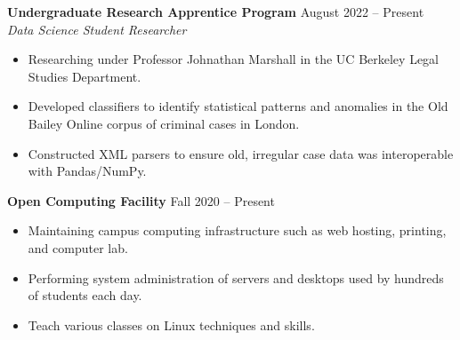 \documentclass{article}
\begin{document}
\begin{adjustwidth}{1em}{1em}


    \textbf{Undergraduate Research Apprentice Program} \hfill August 2022 -- Present
    \\ \textit{Data Science Student Researcher}
    \begin{itemize}
        \item Researching under Professor Johnathan Marshall in the UC Berkeley Legal Studies Department.
        \item Developed classifiers to identify statistical patterns and anomalies in the Old Bailey Online corpus of criminal cases in London.
        \item Constructed XML parsers to ensure old, irregular case data was interoperable with Pandas/NumPy.
    \end{itemize}

    \vspace{1mm}


    \textbf{Open Computing Facility} \hfill Fall 2020 -- Present
    \begin{itemize}
        \item Maintaining campus computing infrastructure such as web hosting, printing, and computer lab.
        \item Performing system administration of servers and desktops used by hundreds of students each day.
        \item Teach various classes on Linux techniques and skills.
    \end{itemize}


\end{adjustwidth}
\end{document}
